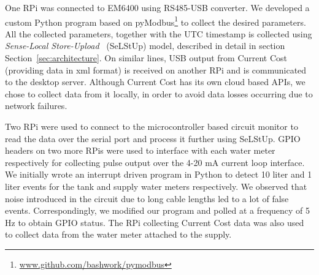 \documentclass[10pt]{sensys-proc}
\newcommand{\secref}[1]{Section~\ref{#1}}
\newcommand{\tabref}[1]{Table~\ref{#1}}
\newcommand{\paradigm}{Sense-Local Store-Upload}
\newcommand{\selstup}{SeLStUp}
\newcommand{\paradigms}{Sense-Local Store-Upload~}
\begin{document}
One RPi was connected to EM6400 using RS485-USB converter. We developed a custom Python program based on pyModbus\footnote{\url{www.github.com/bashwork/pymodbus}} to collect the desired parameters. %
All the collected parameters, together with the UTC timestamp is %
collected using \emph{\paradigms} (\selstup) model, described in detail in section \secref{sec:architecture}. On similar lines, USB output from Current Cost (providing data in xml format) is received on another RPi and is communicated to the desktop server. %
Although Current Cost has its own cloud based APIs, we chose to collect data from it locally, in order to avoid data losses occurring due to network failures. 


Two RPi were used to connect to the microcontroller based circuit monitor to read the data over the serial port and process it further using \selstup.
GPIO headers on two more RPis were used to interface with each water meter respectively for collecting pulse output over the 4-20 mA current loop interface. We initially wrote an interrupt driven program in Python to detect 10 liter and 1 liter events for the tank and supply water meters respectively. We observed that noise introduced in the circuit due to long cable lengths led to a lot of false events. Correspondingly, we modified our program and polled at a frequency of 5 Hz to obtain GPIO status. The RPi collecting Current Cost data was also used to collect data from the water meter attached to the supply.%
\end{document}
